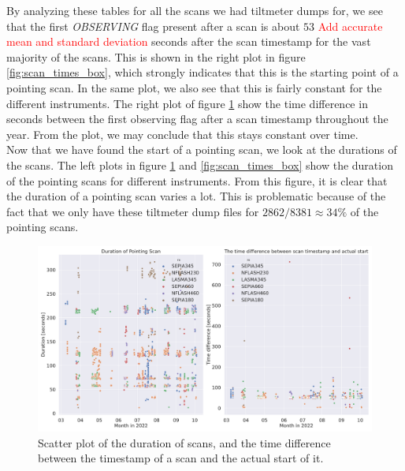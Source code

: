 By analyzing these tables for all the scans we had tiltmeter dumps for,
we see that the first \textit{OBSERVING} flag present after a scan is about $53$ \textcolor{red}{Add accurate mean and standard deviation} seconds after the scan timestamp for the vast majority of the scans.
This is shown in the right plot in figure \ref{fig:scan_times_box}, which strongly indicates that this is the starting point of a pointing scan.
In the same plot, we also see that this is fairly constant for the different instruments.
The right plot of figure \ref{fig:scan_times_date} show the time difference in seconds between the first observing flag after a scan timestamp throughout the year.
From the plot, we may conclude that this stays constant over time.\\

Now that we have found the start of a pointing scan, we look at the durations of the scans. 
The left plots in figure \ref{fig:scan_times_date} and \ref{fig:scan_times_box} show the duration of the pointing scans for different instruments.
From this figure, it is clear that the duration of a pointing scan varies a lot.
This is problematic because of the fact that we only have these tiltmeter dump files for $2862/8381\approx 34\%$ of the pointing scans.


\begin{figure}[H]
    \centering
    \includegraphics[width=1.1\textwidth]{Tiltmeter plots/scan_duration_distribution_date.pdf}
    \caption{Scatter plot of the duration of scans, and the time difference between the timestamp of a scan and the actual start of it.}
    \label{fig:scan_times_date}
\end{figure}


